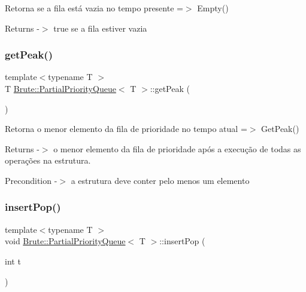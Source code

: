 Retorna se a fila está vazia no tempo presente =$>$ Empty()

\begin{DoxyReturn}{Returns}
-\/$>$ \textquotesingle{}true\textquotesingle{} se a fila estiver vazia 
\end{DoxyReturn}
\mbox{\label{classBrute_1_1PartialPriorityQueue_ad1ca11a46c031d68cf3cd61e820c0036}} 
\subsubsection{\texorpdfstring{get\+Peak()}{getPeak()}}
{\footnotesize\ttfamily template$<$typename T $>$ \\
T \hyperlink{classBrute_1_1PartialPriorityQueue}{Brute\+::\+Partial\+Priority\+Queue}$<$ T $>$\+::get\+Peak (\begin{DoxyParamCaption}{ }\end{DoxyParamCaption})}

Retorna o menor elemento da fila de prioridade no tempo atual =$>$ Get\+Peak()

\begin{DoxyReturn}{Returns}
-\/$>$ o menor elemento da fila de prioridade após a execução de todas as operações na estrutura. 
\end{DoxyReturn}
\begin{DoxyPrecond}{Precondition}
-\/$>$ a estrutura deve conter pelo menos um elemento 
\end{DoxyPrecond}
\mbox{\label{classBrute_1_1PartialPriorityQueue_a2fc548b76d208334f3e237afb6b2eb93}} 
\subsubsection{\texorpdfstring{insert\+Pop()}{insertPop()}}
{\footnotesize\ttfamily template$<$typename T $>$ \\
void \hyperlink{classBrute_1_1PartialPriorityQueue}{Brute\+::\+Partial\+Priority\+Queue}$<$ T $>$\+::insert\+Pop (\begin{DoxyParamCaption}\item[{int}]{t }\end{DoxyParamCaption})}


